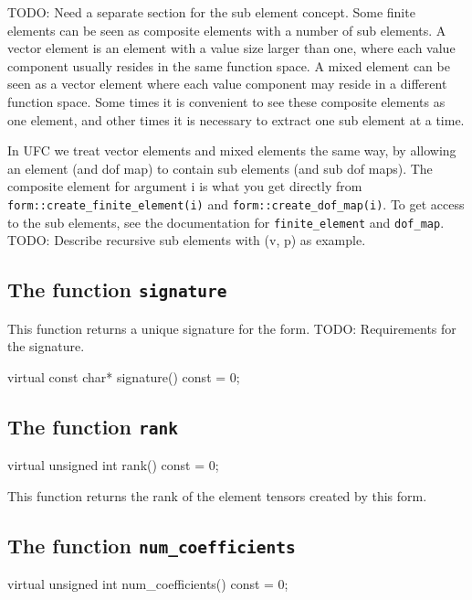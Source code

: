 TODO: Need a separate section for the sub element concept.
Some finite elements can be seen as composite elements with a number of sub elements.
A vector element is an element with a value size larger than one,
where each value component usually resides in the same function space.
A mixed element can be seen as a vector element where each value
component may reside in a different function space.
Some times it is convenient to see these composite elements as one element,
and other times it is necessary to extract one sub element at a time.

In UFC we treat vector elements and mixed elements the same way, by allowing
an element (and dof map) to contain sub elements (and sub dof maps).
The composite element for argument i is what you get directly from
\texttt{form::create\_finite\_element(i)} and \texttt{form::create\_dof\_map(i)}.
To get access to the sub elements, see the documentation for
\texttt{finite\_element} and \texttt{dof\_map}.
TODO: Describe recursive sub elements with (v, p) as example.

\subsection{The function \texttt{signature}}

This function returns a unique signature for the form.
TODO: Requirements for the signature.

\begin{code}
virtual const char* signature() const = 0;
\end{code}

\subsection{The function \texttt{rank}}

\begin{code}
virtual unsigned int rank() const = 0;
\end{code}

This function returns the rank of the element tensors created by this form.

\subsection{The function \texttt{num\_coefficients}}

\begin{code}
virtual unsigned int num_coefficients() const = 0;
\end{code}

